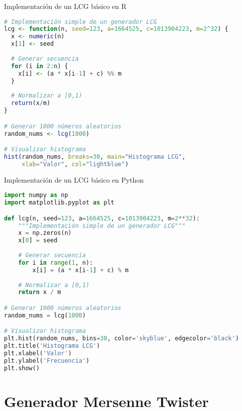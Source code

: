 \documentclass[aspectratio=169]{beamer}
\begin{document}
\begin{frame}{Implementación de un LCG básico en R}
    \begin{lstlisting}[language=R]
# Implementación simple de un generador LCG
lcg <- function(n, seed=123, a=1664525, c=1013904223, m=2^32) {
  x <- numeric(n)
  x[1] <- seed
  
  # Generar secuencia
  for (i in 2:n) {
    x[i] <- (a * x[i-1] + c) %% m
  }
  
  # Normalizar a [0,1)
  return(x/m)
}

# Generar 1000 números aleatorios
random_nums <- lcg(1000)

# Visualizar histograma
hist(random_nums, breaks=30, main="Histograma LCG",
     xlab="Valor", col="lightblue")
    \end{lstlisting}
\end{frame}

\begin{frame}{Implementación de un LCG básico en Python}
    \begin{lstlisting}[language=Python]
import numpy as np
import matplotlib.pyplot as plt

def lcg(n, seed=123, a=1664525, c=1013904223, m=2**32):
    """Implementación simple de un generador LCG"""
    x = np.zeros(n)
    x[0] = seed
    
    # Generar secuencia
    for i in range(1, n):
        x[i] = (a * x[i-1] + c) % m
    
    # Normalizar a [0,1)
    return x / m

# Generar 1000 números aleatorios
random_nums = lcg(1000)

# Visualizar histograma
plt.hist(random_nums, bins=30, color='skyblue', edgecolor='black')
plt.title('Histograma LCG')
plt.xlabel('Valor')
plt.ylabel('Frecuencia')
plt.show()
    \end{lstlisting}
\end{frame}

\section{Generador Mersenne Twister}
\end{document}
